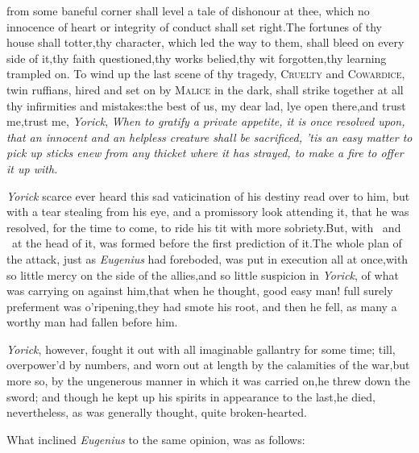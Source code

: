 \documentclass{article}
\begin{document}
 from some baneful corner shall level a tale of dishonour at
thee,\pb
which no innocence of heart or integrity of conduct shall set right.\tsh  The
fortunes of thy house shall totter,\tsk  thy character, which led the way to them,
shall bleed on every side of it,\tsk  thy faith questioned,\tsk  thy works
belied,\tsk  thy wit forgotten,\tsk  thy learning trampled on. To wind up the last
scene of thy tragedy, \textsc{Cruelty} and \textsc{Cowardice}, twin ruffians, hired
and set on by \textsc{Malice} in the dark, shall strike together at all thy
infirmities and mistakes:\tsh  the best of us, my dear lad, lye open there,\tsk  and
trust me,\tsk\break  trust me, \textit{Yorick}, \textit{When to gratify a private appetite, it is
once resolved upon, that an innocent and an helpless creature shall be sacrificed,
’tis an easy matter to pick up sticks enew from any thicket where it has strayed,
to make a fire to offer it up with.}

\newpage
\textit{Yorick} scarce ever heard this sad vaticination of his
destiny read over to him, but with a tear stealing from his eye,
and a promissory look attending it, that he was resolved, for the
time to come, to ride his tit with more sobriety.\tsh  But,
with \astv\ and \astv\ at the 
head of it, was formed before the first prediction of it.\tsk  The
whole plan of the attack, just as \textit{Eugenius} had foreboded,
was put in execution all at once,\tsk  with so little mercy on the side of the allies,\tsk  and so little
suspicion in \textit{Yorick}, of what was carrying on against
him,\tsk  that when he thought, good easy man! full surely
preferment was o’ripening,\tsk  they had smote his root, and
then he fell, as many a worthy man had fallen before him.

\newpage
\textit{Yorick}, however, fought it out with all imaginable
gallantry for some time; till, overpower’d by numbers, and worn out
at length by the calamities of the war,\tsk  but more so, by the
ungenerous manner in which it was carried on,\tsk  he threw down
the sword; and though he kept up his spirits in appearance to the
last,\tsk he died, nevertheless, as was generally thought, quite
broken-hearted.

What inclined \textit{Eugenius} to the same opinion, was as
follows:
\end{document}
